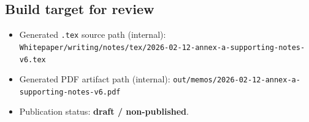 \documentclass[11pt]{article}
\begin{document}
\hypertarget{build-target-for-review}{%
\subsection{Build target for review}\label{build-target-for-review}}

\begin{itemize}
\tightlist
\item
  Generated \texttt{.tex} source path (internal):
  \texttt{Whitepaper/writing/notes/tex/2026-02-12-annex-a-supporting-notes-v6.tex}
\item
  Generated PDF artifact path (internal):
  \texttt{out/memos/2026-02-12-annex-a-supporting-notes-v6.pdf}
\item
  Publication status: \textbf{draft / non-published}.
\end{itemize}
\end{document}
